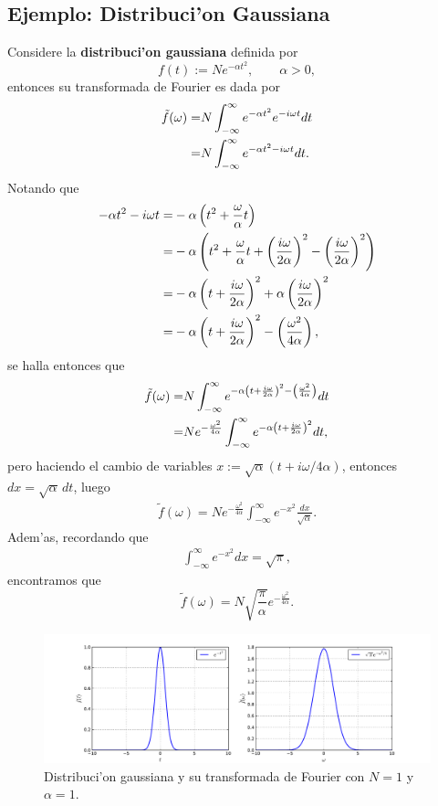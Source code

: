 \subsection{Ejemplo: Distribuci'on Gaussiana}
Considere la \textbf{distribuci'on gaussiana} definida por
\begin{equation}\label{fgauss}
f(t):=N e^{-\alpha t^2}, \qquad \alpha>0,
\end{equation}
entonces su transformada de Fourier es dada por
\begin{align}
\tilde{f}(\omega)=&N\int_{-\infty}^{\infty}e^{-\alpha t^2} e^{-i \omega t}dt\notag \\
=&N\int_{-\infty}^{\infty}e^{-\alpha t^2-i\omega t} dt.
\end{align}
Notando que
\begin{align}
-\alpha t^2-i\omega t=&-\alpha \left(t^2+\frac{\omega}{\alpha}t\right) \notag \\
=&-\alpha\left(t^2+\frac{\omega}{\alpha}t+\left(\frac{i\omega}{2\alpha}\right)^2-\left(\frac{i\omega}{2\alpha}\right)^2\right) \notag \\
=&-\alpha \left( t+\frac{i\omega}{2\alpha} \right)^2+\alpha\left(\frac{i\omega}{2\alpha}\right)^2\notag \\
=&-\alpha \left( t+\frac{i\omega}{2\alpha} \right)^2-\left(\frac{\omega^2}{4\alpha}\right),
\end{align}
se halla entonces que
\begin{align}
\tilde{f}(\omega)=&N\int_{-\infty}^{\infty}e^{-\alpha \left( t+\frac{i\omega}{2\alpha} \right)^2-\left(\frac{\omega^2}{4\alpha}\right)}dt\notag\\
=&N e^{-\frac{\omega^2}{4\alpha}}\int_{-\infty}^{\infty}e^{-\alpha \left( t+\frac{i\omega}{2\alpha} \right)^2}dt,
\end{align}
pero haciendo el cambio de variables $x:=\sqrt{\alpha}(t+i\omega/4\alpha)$, entonces $dx=\sqrt{\alpha}\,dt$, luego
\begin{align}
\tilde{f}(\omega)=N e^{-\frac{\omega^2}{4\alpha}}\int_{-\infty}^{\infty}e^{-x^2} \frac{dx}{\sqrt{\alpha}}.
\end{align}
Adem'as, recordando que
\begin{align}
\int_{-\infty}^{\infty}e^{-x^2}dx=\sqrt{\pi},
\end{align}
encontramos que
\begin{equation}\label{Tfgauss}
\tilde{f}(\omega)=N\sqrt{\frac{\pi}{\alpha}}e^{-\frac{\omega^2}{4\alpha}}.
\end{equation}
\begin{figure}[h]
\centering
\includegraphics[scale=0.4]{figs/fig-Fourier-Gaussiana.pdf}
\caption{Distribuci'on gaussiana y su transformada de Fourier con $N=1$ y $\alpha=1$.}
\label{im:gaussiana}
\end{figure}


